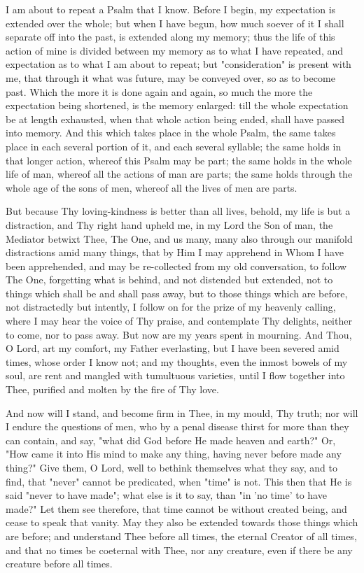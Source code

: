 \documentclass[b5paper,openright,12pt,twoside]{book}
\begin{document}
I am about to repeat a Psalm that I know. Before I begin, my expectation
is extended over the whole; but when I have begun, how much soever of
it I shall separate off into the past, is extended along my memory; thus
the life of this action of mine is divided between my memory as to what
I have repeated, and expectation as to what I am about to repeat; but
"consideration" is present with me, that through it what was future, may
be conveyed over, so as to become past. Which the more it is done again
and again, so much the more the expectation being shortened, is the
memory enlarged: till the whole expectation be at length exhausted, when
that whole action being ended, shall have passed into memory. And this
which takes place in the whole Psalm, the same takes place in each
several portion of it, and each several syllable; the same holds in that
longer action, whereof this Psalm may be part; the same holds in the
whole life of man, whereof all the actions of man are parts; the same
holds through the whole age of the sons of men, whereof all the lives of
men are parts.

But because Thy loving-kindness is better than all lives, behold, my
life is but a distraction, and Thy right hand upheld me, in my Lord the
Son of man, the Mediator betwixt Thee, The One, and us many, many also
through our manifold distractions amid many things, that by Him I may
apprehend in Whom I have been apprehended, and may be re-collected from
my old conversation, to follow The One, forgetting what is behind, and
not distended but extended, not to things which shall be and shall
pass away, but to those things which are before, not distractedly but
intently, I follow on for the prize of my heavenly calling, where I may
hear the voice of Thy praise, and contemplate Thy delights, neither
to come, nor to pass away. But now are my years spent in mourning. And
Thou, O Lord, art my comfort, my Father everlasting, but I have been
severed amid times, whose order I know not; and my thoughts, even
the inmost bowels of my soul, are rent and mangled with tumultuous
varieties, until I flow together into Thee, purified and molten by the
fire of Thy love.

And now will I stand, and become firm in Thee, in my mould, Thy truth;
nor will I endure the questions of men, who by a penal disease thirst
for more than they can contain, and say, "what did God before He made
heaven and earth?" Or, "How came it into His mind to make any thing,
having never before made any thing?" Give them, O Lord, well to
bethink themselves what they say, and to find, that "never" cannot be
predicated, when "time" is not. This then that He is said "never to have
made"; what else is it to say, than "in 'no time' to have made?" Let
them see therefore, that time cannot be without created being, and cease
to speak that vanity. May they also be extended towards those things
which are before; and understand Thee before all times, the eternal
Creator of all times, and that no times be coeternal with Thee, nor any
creature, even if there be any creature before all times.
\end{document}
